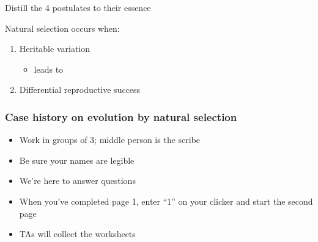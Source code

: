 \begin{frame}
    Distill the 4 postulates to their essence
    \vspace{0.5cm}

    Natural selection occurs when:
    \vspace{0.5cm}

    \begin{enumerate}
        \item<2-> Heritable variation
        \vspace{0.5cm}

        \begin{itemize}
            \item<3-> leads to
        \end{itemize}

        \vspace{0.5cm}
        \item<4-> Differential reproductive success 
    \end{enumerate}

    \vspace{0.5cm}

\end{frame}

\begin{frame}
    \frametitle{Case history on evolution by natural selection}

    \begin{itemize}
        \item Work in groups of 3; middle person is the scribe
        \item Be sure your names are legible
        \item We're here to answer questions
        \item When you've completed page 1, enter ``1'' on your clicker and
            start the second page
        \item TAs will collect the worksheets
    \end{itemize}
\end{frame}

